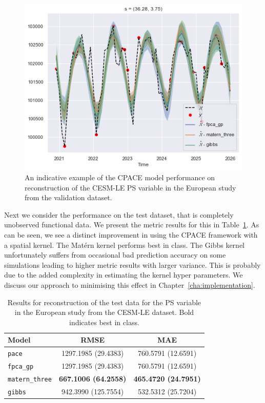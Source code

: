 \begin{figure}
	\centering
	\includegraphics[width=\textwidth]{train_ex_ps_eur}
	\caption[An indicative example of the CPACE model performance on reconstruction of the CESM-LE PS variable in the European study from the validation dataset.]{An indicative example of the CPACE model performance on reconstruction of the CESM-LE PS variable in the European study from the validation dataset.}
	\label{fig:train_ex_ps_eur}
\end{figure}

Next we consider the performance on the test dataset, that is completely unobserved functional data.
We present the metric results for this in Table~\ref{tab:test_cesm_ps_eur}.
As can be seen, we see a distinct improvement in using the CPACE framework with a spatial kernel.
The Mat\'ern kernel performs best in class.
The Gibbs kernel unfortunately suffers from occasional bad prediction accuracy on some simulations leading to higher metric results with larger variance.
This is probably due to the added complexity in estimating the kernel hyper parameters.
We discuss our approach to minimising this effect in Chapter~\ref{cha:implementation}.

\begin{table}
	\caption[Results for the PS variable on test data in the European study.]{Results for reconstruction of the test data for the PS variable in the European study from the CESM-LE dataset. Bold indicates best in class.}
	\centering
	\label{tab:test_cesm_ps_eur}
	\begin{tabular}{lcc}
		\toprule
		\textbf{Model} & \textbf{RMSE} & \textbf{MAE} \\
		\midrule
		\verb*|pace| & 1297.1985 (29.4383) & 760.5791 (12.6591) \\
		\verb*|fpca_gp| & 1297.1985 (29.4383) & 760.5791 (12.6591) \\
		\verb*|matern_three| & \textbf{667.1006 (64.2558)}& \textbf{465.4720 (24.7951)}\\
		\verb*|gibbs| & 942.3990 (125.7554) & 532.5312 (25.7204)\\
		\bottomrule
	\end{tabular}
\end{table}

